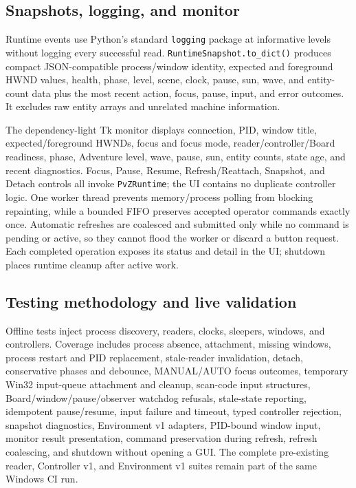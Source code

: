 \documentclass[11pt,a4paper]{article}
\begin{document}
\subsection{Snapshots, logging, and monitor}
Runtime events use Python's standard \texttt{logging} package at informative levels without logging every successful read. \texttt{RuntimeSnapshot.to\_dict()} produces compact JSON-compatible process/window identity, expected and foreground HWND values, health, phase, level, scene, clock, pause, sun, wave, and entity-count data plus the most recent action, focus, pause, input, and error outcomes. It excludes raw entity arrays and unrelated machine information.

The dependency-light Tk monitor displays connection, PID, window title, expected/foreground HWNDs, focus and focus mode, reader/controller/Board readiness, phase, Adventure level, wave, pause, sun, entity counts, state age, and recent diagnostics. Focus, Pause, Resume, Refresh/Reattach, Snapshot, and Detach controls all invoke \texttt{PvZRuntime}; the UI contains no duplicate controller logic. One worker thread prevents memory/process polling from blocking repainting, while a bounded FIFO preserves accepted operator commands exactly once. Automatic refreshes are coalesced and submitted only while no command is pending or active, so they cannot flood the worker or discard a button request. Each completed operation exposes its status and detail in the UI; shutdown places runtime cleanup after active work.

\subsection{Testing methodology and live validation}
Offline tests inject process discovery, readers, clocks, sleepers, windows, and controllers. Coverage includes process absence, attachment, missing windows, process restart and PID replacement, stale-reader invalidation, detach, conservative phases and debounce, MANUAL/AUTO focus outcomes, temporary Win32 input-queue attachment and cleanup, scan-code input structures, Board/window/pause/observer watchdog refusals, stale-state reporting, idempotent pause/resume, input failure and timeout, typed controller rejection, snapshot diagnostics, Environment v1 adapters, PID-bound window input, monitor result presentation, command preservation during refresh, refresh coalescing, and shutdown without opening a GUI. The complete pre-existing reader, Controller v1, and Environment v1 suites remain part of the same Windows CI run.
\end{document}
